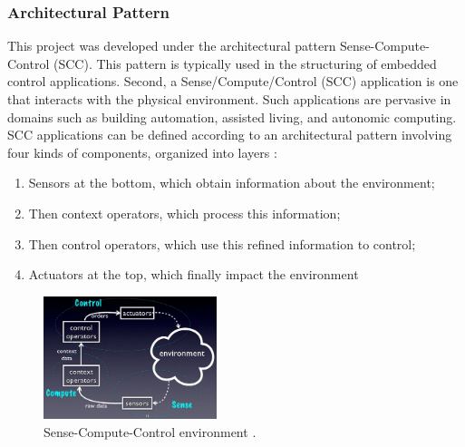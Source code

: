 \documentclass{acm_proc_article-sp}
\begin{document}
\subsubsection{Architectural Pattern}
This project was developed under the architectural pattern Sense-Compute-Control (SCC). This pattern is typically used in the structuring of embedded control applications. Second\cite{taylor2009software}, a Sense/Compute/Control (SCC) application is one that interacts with the physical environment. Such applications are pervasive in domains such as building automation, assisted living, and autonomic computing. SCC applications can be defined according to an architectural pattern involving four kinds of components, organized into layers \cite{edwards2009architecture}: 
\begin{enumerate}
\item Sensors at the bottom, which obtain information about the environment; 
\item Then context operators, which process this information; 
\item Then control operators, which use this refined information to control;
\item Actuators at the top, which finally impact the environment
\end{enumerate}

\begin{figure}[h]
\centering
    \includegraphics[width=0.45\textwidth,natwidth=610,natheight=642]{pictures/senseComputeControl.png}
    \caption{Sense-Compute-Control environment \protect\cite{DamienCassou}.}
    \label{fig:scc}
\end{figure}
\end{document}
